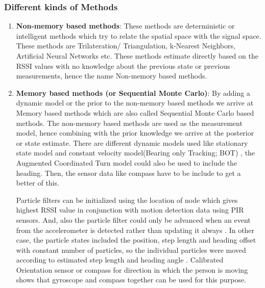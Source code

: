 \subsubsection{Different kinds of Methods} \label{methods}
\begin{enumerate}
\item \textbf{Non-memory based methods}:
These methods are deterministic or intelligent methods which try to relate the spatial space with the signal space. These methods are Trilateration/ Triangulation, k-Nearest Neighbors, Artificial Neural Networks etc. These methods estimate directly based on the RSSI values with no knowledge about the previous state or previous measurements, hence the name Non-memory based methods.
 
\item \textbf{Memory based methods (or Sequential Monte Carlo)}:
By adding a dynamic model or the prior to the non-memory based methods we arrive at Memory  based methods which are also called Sequential Monte Carlo based methods. The non-memory based methods are used as the measurement model, hence combining with the prior knowledge we arrive at the posterior or state estimate. There are different dynamic models used like stationary state model and constant velocity model(Bearing only Tracking; BOT) \cite{honkavirta}, the Augmented Coordinated Turn model could also be used to include the heading. Then, the sensor data like compass have to be include to get a better of this. 

Particle filters can be initialized using the location of node which gives highest RSSI \cite{honkavirta} value in conjunction with motion detection data using PIR sensors. And, also the particle filter could only be advanced when an event from the accelerometer is detected rather than updating it always \cite{torres-sospedra}. In other case, the particle states included the position, step length and heading offset with constant number of particles, so the individual particles were moved according to estimated step length and heading angle \cite{nurminen}. Calibrated Orientation sensor or compass for direction in which the person is moving\cite{torres-sospedra} shows that gyroscope and compass together can be used for this purpose.

\end{enumerate}
